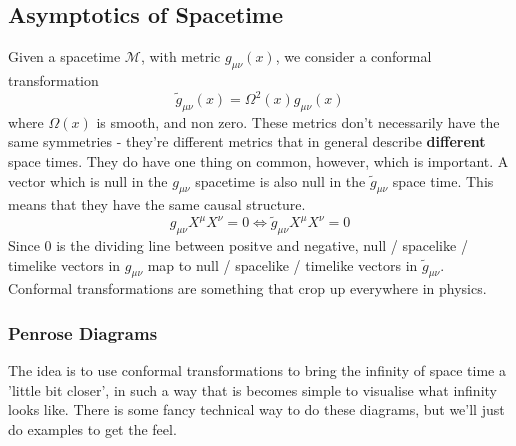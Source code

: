 \subsection{Asymptotics of Spacetime} 
Given a spacetime $ \mathcal{ M } $, with metric 
$ g _{ \mu \nu } ( x) $, we consider a 
conformal transformation 
\[
	\tilde{ g } _{ \mu \nu } ( x) = \Omega ^ 2 (  x) g_{ \mu \nu } ( x)  
\] where $ \Omega( x) $ is smooth, and non zero. 
These metrics don't necessarily 
have the same symmetries - they're different metrics 
that in general describe  \textbf{different } space times. 
They do have one thing on common, however, 
which is important. A vector which is 
null in the $ g _{ \mu \nu } $ spacetime 
is also null in the $ \tilde{ g } _{ \mu \nu  }  $ space 
time. 
This means that they have the same causal structure. 
\[
 g_{ \mu \nu }  X^ \mu    X^\nu =0   \iff \tilde{ g } _{ \mu \nu } X^\mu X^\nu  = 0 
\] Since 0 is the dividing line between positve and negative, 
null / spacelike / timelike vectors in $ g _{ \mu \nu } $ 
map to null / spacelike / timelike vectors in $ \tilde{ g } _{ \mu \nu }  $. 
Conformal transformations are something that crop up 
everywhere in physics. 

\subsubsection{Penrose Diagrams}
The idea is to use conformal transformations 
to bring the infinity of space time 
a 'little bit closer', in such a way 
that is becomes simple to visualise what infinity looks like. 
There is some fancy technical way to do these diagrams, 
but we'll just do examples to get the feel.

